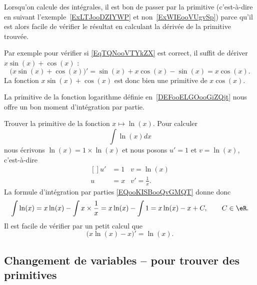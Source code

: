 \begin{remark}
	Lorsqu'on calcule des intégrales, il est bon de passer par la primitive (c'est-à-dire en suivant l'exemple~\ref{ExLTJooDZIYWP} et non~\ref{ExWIEooVUgvSp}) parce qu'il est alors facile de vérifier le résultat en calculant la dérivée de la primitive trouvée.

	Par exemple pour vérifier si \eqref{EqTQNooVTYkZX} est correct, il suffit de dériver \( x\sin(x)+\cos(x)\) :
	\begin{equation}
		\big( x\sin(x)+\cos(x) \big)'=\sin(x)+x\cos(x)-\sin(x)=x\cos(x).
	\end{equation}
	La fonction \( x\sin(x)+\cos(x)\) est donc bien une primitive de \( x\cos(x)\).
\end{remark}

\begin{example}\label{primln}
	La primitive de la fonction logarithme définie en~\ref{DEFooELGOooGiZQjt} nous offre un bon moment d'intégration par partie.

	Trouver la primitive de la fonction \( x\mapsto \ln(x)\). Pour calculer
	\begin{equation}
		\int\ln(x)dx
	\end{equation}
	nous écrivons \( \ln(x)=1\times \ln(x)\) et nous posons \( u'=1\) et \( v=\ln(x)\), c'est-à-dire
	\begin{equation}
		\begin{aligned}[]
			u' & =1 & v=\ln(x)          \\
			u  & =x & v'=\frac{1}{ x }.
		\end{aligned}
	\end{equation}
	La formule d'intégration par parties \eqref{EQooKISBooQvGMQT} donne donc
	\begin{equation}
		\int \ln(x)=x\ln(x)-\int x\times \frac{1}{ x }=x\ln(x)-\int 1=x\ln(x)-x+C, \qquad C\in\eR.
	\end{equation}
	Il est facile de vérifier par un petit calcul que
	\begin{equation}
		\big( x\ln(x)-x \big)'=\ln(x).
	\end{equation}
\end{example}


\subsection{Changement de variables -- pour trouver des primitives}

